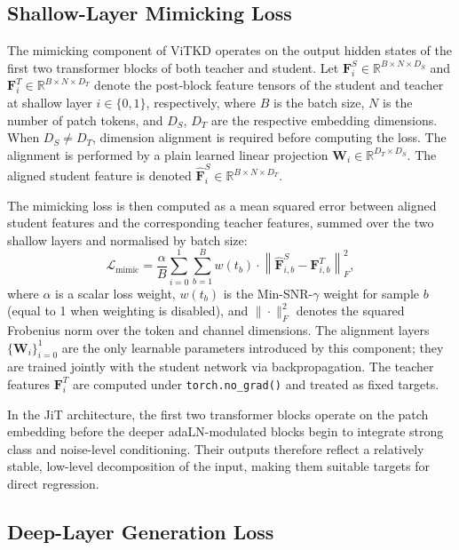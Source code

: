 \subsection*{Shallow-Layer Mimicking Loss}
\label{subsec:vitkd_mimic}

The mimicking component of ViTKD operates on the output hidden states of the first two transformer blocks of both teacher and student. Let $\mathbf{F}_i^S \in \mathbb{R}^{B \times N \times D_S}$ and $\mathbf{F}_i^T \in \mathbb{R}^{B \times N \times D_T}$ denote the post-block feature tensors of the student and teacher at shallow layer $i \in \{0, 1\}$, respectively, where $B$ is the batch size, $N$ is the number of patch tokens, and $D_S$, $D_T$ are the respective embedding dimensions. When $D_S \neq D_T$, dimension alignment is required before computing the loss. The alignment is performed by a plain learned linear projection $\mathbf{W}_i \in \mathbb{R}^{D_T \times D_S}$. The aligned student feature is denoted $\hat{\mathbf{F}}_i^S \in \mathbb{R}^{B \times N \times D_T}$.

The mimicking loss is then computed as a mean squared error between aligned student features and the corresponding teacher features, summed over the two shallow layers and normalised by batch size:
%
\begin{equation}
    \mathcal{L}_{\text{mimic}} = \frac{\alpha}{B} \sum_{i=0}^{1} \sum_{b=1}^{B} w(t_b) \cdot \left\| \hat{\mathbf{F}}_{i,b}^S - \mathbf{F}_{i,b}^T \right\|_F^2,
    \label{eq:loss_mimic}
\end{equation}
%
where $\alpha$ is a scalar loss weight, $w(t_b)$ is the Min-SNR-$\gamma$ weight for sample $b$ (equal to 1 when weighting is disabled), and $\|\cdot\|_F^2$ denotes the squared Frobenius norm over the token and channel dimensions. The alignment layers $\{\mathbf{W}_i\}_{i=0}^{1}$ are the only learnable parameters introduced by this component; they are trained jointly with the student network via backpropagation. The teacher features $\mathbf{F}_i^T$ are computed under \texttt{torch.no\_grad()} and treated as fixed targets.

In the JiT architecture, the first two transformer blocks operate on the patch embedding before the deeper adaLN-modulated blocks begin to integrate strong class and noise-level conditioning. Their outputs therefore reflect a relatively stable, low-level decomposition of the input, making them suitable targets for direct regression.


\subsection*{Deep-Layer Generation Loss}
\label{subsec:vitkd_gen}

